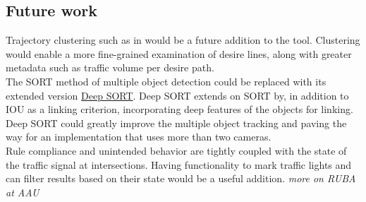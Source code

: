 \subsection{Future work}
Trajectory clustering such as in \cite{gariel_trajectory_2011} would be a future addition to the tool.
Clustering would enable a more fine-grained examination of desire lines,
along with greater metadata such as traffic volume per desire path.
\ \\

The SORT method of multiple object detection could be replaced with its extended version \href{https://github.com/nwojke/deep_sort}{Deep SORT}.
Deep SORT extends on SORT by, in addition to IOU as a linking criterion, incorporating
deep features of the objects for linking. Deep SORT could greatly improve the multiple object tracking
and paving the way for an implementation that uses more than two cameras.
\ \\

Rule compliance and unintended behavior are tightly coupled with the state of the traffic signal at intersections. 
Having functionality to mark traffic lights and can filter results based on their state would
be a useful addition. \textit{more on RUBA at AAU}